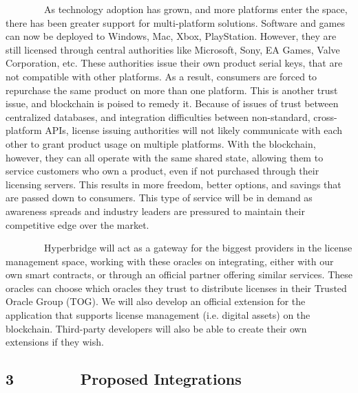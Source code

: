 \documentclass[]{article}
\begin{document}
{~~~~~~~~As technology adoption has grown, and more platforms enter the
space, there has been greater support for multi-platform solutions.
Software and games can now be deployed to Windows, Mac, Xbox,
PlayStation. However, they are still licensed through central
authorities like Microsoft, Sony, EA Games, Valve Corporation, etc.
These authorities issue their own product serial keys, that are not
compatible with other platforms. As a result, consumers are forced to
repurchase the same product on more than one platform. This is another
trust issue, and blockchain is poised to remedy it. Because of issues of
trust between centralized databases, and integration difficulties
between non-standard, cross-platform APIs, license issuing authorities
will not likely communicate with each other to grant product usage on
multiple platforms. With the blockchain, however, they can all operate
with the same shared state, allowing them to service customers who own a
product, even if not purchased through their licensing servers. This
results in more freedom, better options, and savings that are passed
down to consumers. This type of service will be in demand as awareness
spreads and industry leaders are pressured to maintain their competitive
edge over the market.}

{}

{~~~~~~~~Hyperbridge will act as a gateway for the biggest providers in
the license management space, working with these oracles on integrating,
either with our own smart contracts, or through an official partner
offering similar services. These oracles can choose which oracles they
trust to distribute licenses in their Trusted Oracle Group (TOG). We
will also develop an official extension for the application that
supports license management (i.e. digital assets) on the blockchain.
Third-party developers will also be able to create their own extensions
if they wish. }

\hypertarget{h.p63c5ugek5m4}{%
\subsection{\texorpdfstring{{}}{}}\label{h.p63c5ugek5m4}}

\hypertarget{h.es6ndspslxqp}{%
\subsection{\texorpdfstring{{3~~~~~~~~Proposed
Integrations}}{3~~~~~~~~Proposed Integrations}}\label{h.es6ndspslxqp}}
\end{document}
